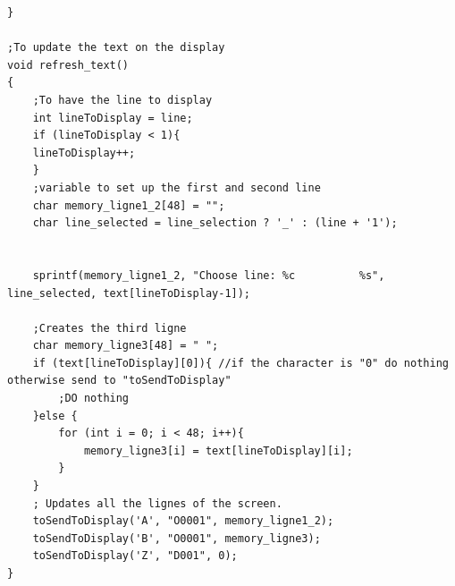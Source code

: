 \documentclass[a4paper,12pt]{article}
\begin{document}
\begin{lstlisting}
}

;To update the text on the display
void refresh_text()
{
	;To have the line to display
	int lineToDisplay = line;
	if (lineToDisplay < 1){
	lineToDisplay++;
	}
	;variable to set up the first and second line 
	char memory_ligne1_2[48] = "";
	char line_selected = line_selection ? '_' : (line + '1');

	
	sprintf(memory_ligne1_2, "Choose line: %c          %s", line_selected, text[lineToDisplay-1]);

	;Creates the third ligne 
	char memory_ligne3[48] = " ";
	if (text[lineToDisplay][0]){ //if the character is "0" do nothing otherwise send to "toSendToDisplay"
		;DO nothing
	}else { 
		for (int i = 0; i < 48; i++){
			memory_ligne3[i] = text[lineToDisplay][i];
		}
	}
	; Updates all the lignes of the screen. 
	toSendToDisplay('A', "O0001", memory_ligne1_2);
	toSendToDisplay('B', "O0001", memory_ligne3);
	toSendToDisplay('Z', "D001", 0);
}

\end{lstlisting}
\end{document}
